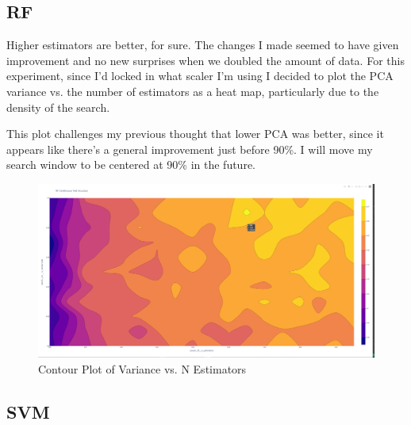 \documentclass[12pt]{article}
\begin{document}
\subsection{RF}

Higher estimators are better, for sure. The changes I made seemed to have given improvement and no new surprises 
when we doubled the amount of data. For this experiment, since I'd locked in what scaler I'm using I decided to plot the 
PCA variance vs. the number of estimators as a heat map, particularly due to the density of the search.

This plot challenges my previous thought that lower PCA was better, since it appears like there's a general improvement 
just before 90\%. I will move my search window to be centered at 90\% in the future.

\begin{figure}
    \includegraphics[width=.95\textwidth]{../../results_Experiment2/rf/Contour.PNG}
    \caption{Contour Plot of Variance vs. N Estimators}
    \label{figure8}
\end{figure}

\subsection{SVM}
\end{document}
